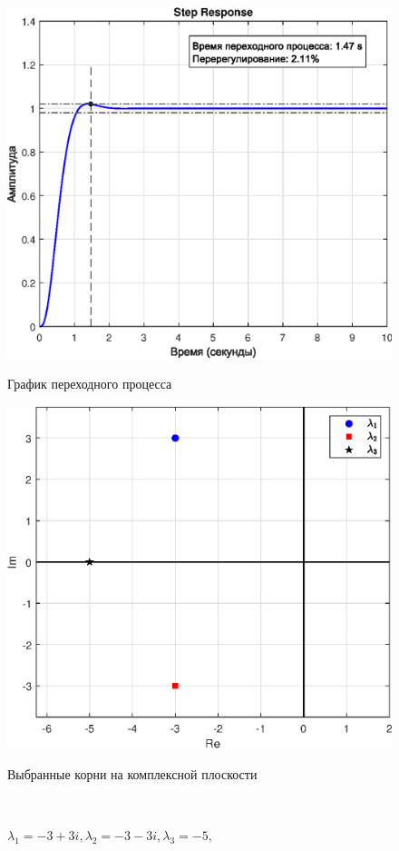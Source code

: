 \documentclass[a4paper]{article}
\begin{document}
\begin{figure}[H]
    \begin{minipage}{0.5\textwidth}
        \centering \includegraphics[width=\textwidth]{ex2/-3+3i_-3-3i_-5.eps}
        \caption{$\lambda_1=-3+3i, \lambda_2=-3-3i, \lambda_3=-5,$}
        \centerline{График переходного процесса}
    \end{minipage}\hfill
    \begin{minipage}{0.5\textwidth}
        \centering \includegraphics[width=\textwidth]{ex2/complex_plan_-3+3i_-3-3i_-5.eps}
        \caption{$\lambda_1=-3+3i, \lambda_2=-3-3i, \lambda_3=-5,$}
        \centerline{Выбранные корни на комплексной плоскости}
    \end{minipage}\\[1em]
\end{figure}\noindent\
\end{document}
